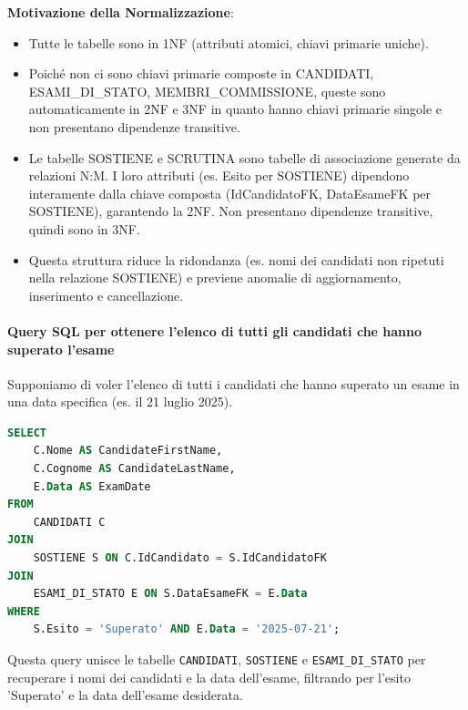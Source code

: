 \textbf{Motivazione della Normalizzazione}:
\begin{itemize}
    \item Tutte le tabelle sono in 1NF (attributi atomici, chiavi primarie uniche).
    \item Poiché non ci sono chiavi primarie composte in \textsf{CANDIDATI}, \textsf{ESAMI\_DI\_STATO}, \textsf{MEMBRI\_COMMISSIONE}, queste sono automaticamente in 2NF e 3NF in quanto hanno chiavi primarie singole e non presentano dipendenze transitive.
    \item Le tabelle \textsf{SOSTIENE} e \textsf{SCRUTINA} sono tabelle di associazione generate da relazioni N:M. I loro attributi (es. \textsf{Esito} per \textsf{SOSTIENE}) dipendono interamente dalla chiave composta (\textsf{IdCandidatoFK}, \textsf{DataEsameFK} per \textsf{SOSTIENE}), garantendo la 2NF. Non presentano dipendenze transitive, quindi sono in 3NF.
    \item Questa struttura riduce la ridondanza (es. nomi dei candidati non ripetuti nella relazione \textsf{SOSTIENE}) e previene anomalie di aggiornamento, inserimento e cancellazione.
\end{itemize}

\paragraph{Query SQL per ottenere l'elenco di tutti gli candidati che hanno superato l'esame}
Supponiamo di voler l'elenco di tutti i candidati che hanno superato un esame in una data specifica (es. il 21 luglio 2025).

\begin{lstlisting}[language=SQL, caption={Query per l'elenco dei candidati che hanno superato l'esame in una data specifica}]
SELECT
    C.Nome AS CandidateFirstName,
    C.Cognome AS CandidateLastName,
    E.Data AS ExamDate
FROM
    CANDIDATI C
JOIN
    SOSTIENE S ON C.IdCandidato = S.IdCandidatoFK
JOIN
    ESAMI_DI_STATO E ON S.DataEsameFK = E.Data
WHERE
    S.Esito = 'Superato' AND E.Data = '2025-07-21';
\end{lstlisting}
Questa query unisce le tabelle \lstinline{CANDIDATI}, \lstinline{SOSTIENE} e \lstinline{ESAMI_DI_STATO} per recuperare i nomi dei candidati e la data dell'esame, filtrando per l'esito 'Superato' e la data dell'esame desiderata.